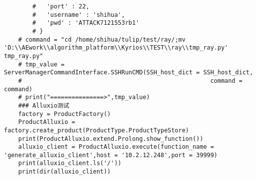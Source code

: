 \documentclass[cn,hazy,blue,14pt,screen]{elegantnote}
\begin{document}
\begin{lstlisting}
		# 	'port' : 22,
		# 	'username' : 'shihua',
		# 	'pwd' : 'ATTACK7121553rb1'
		# }
	# command = "cd /home/shihua/tulip/test/ray/;mv 'D:\\AEwork\\algorithm_platform\\Kyrios\\TEST\\ray\\tmp_ray.py' tmp_ray.py"
	# tmp_value = ServerManagerCommandInterface.SSHRunCMD(SSH_host_dict = SSH_host_dict,
	#                                                     command = command)
	# print("===============>",tmp_value)
	### Alluxio测试
	factory = ProductFactory()
	ProductAlluxio = factory.create_product(ProductType.ProductTypeStore)
	print(ProductAlluxio.extend.Prolong.show_function())
	alluxio_client = ProductAlluxio.execute(function_name = 'generate_alluxio_client',host = '10.2.12.248',port = 39999)
	print(alluxio_client.ls('/'))
	print(dir(alluxio_client))
\end{lstlisting}
\end{document}

